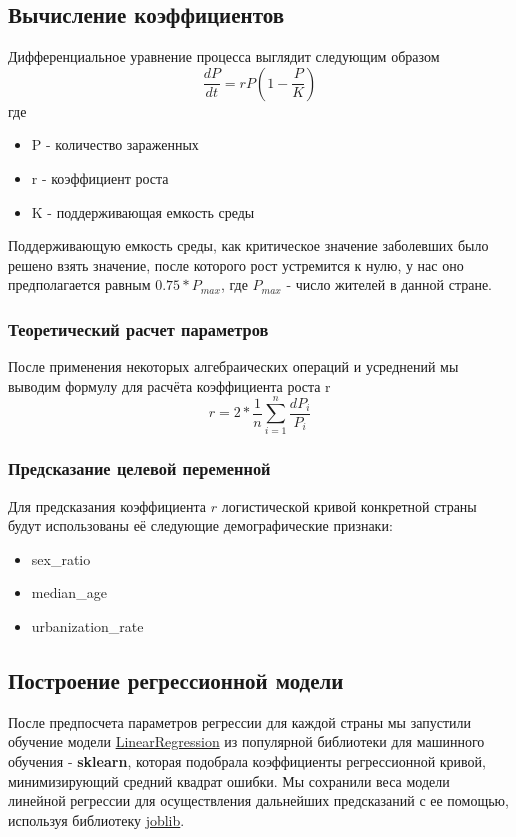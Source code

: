 \documentclass[a4paper]{article}
\begin{document}
\subsection{Вычисление коэффициентов}
Дифференциальное уравнение процесса выглядит следующим образом
\[\frac{dP}{dt} = rP(1-\frac{P}{K})\]
где 
\begin{itemize}
    \item P - количество зараженных
    \item r - коэффициент роста
    \item K - поддерживающая емкость среды
\end{itemize} 
Поддерживающую емкость среды, как критическое значение заболевших было решено взять значение, после которого рост устремится к нулю, у нас оно предполагается равным \(0.75 * P_{max}\), где \(P_{max}\) - число жителей в данной стране.
\subsubsection{Теоретический расчет параметров}
После применения некоторых алгебраических операций и усреднений мы выводим формулу для расчёта коэффициента роста r
\[r = 2 * \frac{1}{n}\sum_{i=1}^{n} \frac{dP_i}{P_i}\]
\subsubsection{Предсказание целевой переменной}
Для предсказания коэффициента $r$ логистической кривой конкретной страны будут использованы её следующие демографические признаки:
\begin{itemize}
    \item sex\_ratio
    \item median\_age
    \item urbanization\_rate
\end{itemize}
\subsection{Построение регрессионной модели}
    После предпосчета параметров регрессии для каждой страны мы запустили обучение модели \href{https://scikit-learn.org/stable/modules/generated/sklearn.linear_model.LinearRegression.html}{LinearRegression} из популярной библиотеки для машинного обучения - \textbf{sklearn}, которая подобрала коэффициенты регрессионной кривой, минимизирующий средний квадрат ошибки. Мы сохранили веса модели линейной регрессии для осуществления дальнейших предсказаний с ее помощью, используя библиотеку \href{https://joblib.readthedocs.io/en/latest/}{joblib}.
\end{document}
